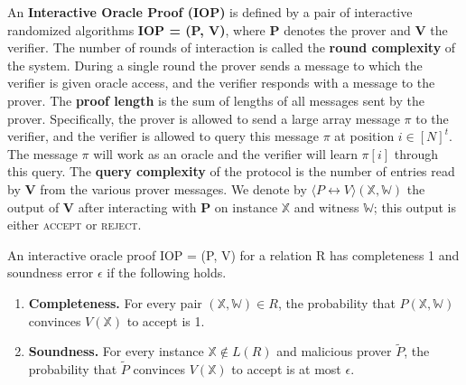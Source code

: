 \begin{definition}
An \textbf{Interactive Oracle Proof (IOP)} is defined by a pair of interactive randomized
algorithms \textbf{IOP = (P, V)}, where \textbf{P} denotes the prover and \textbf{V} the verifier. 
The number of rounds of interaction is called the \textbf{round complexity} of the system. 
During a single round the prover sends a message to which the verifier is given oracle access, and the verifier responds with a message to the prover. 
The \textbf{proof length} is the sum of lengths of all messages sent by the prover. Specifically, the prover is allowed to send a large array message $\pi$ to the verifier, and the verifier is allowed to query this message $\pi$ at position $i \in [N]^t$. The message $\pi$ will work as an oracle and the verifier will learn $\pi[i]$ through this query.
The \textbf{query complexity} of the protocol is the number of entries read by \textbf{V} from the various prover messages.
We denote by $\langle P \leftrightarrow V \rangle (\mathbb{X}, \mathbb{W})$ the output of \textbf{V} after interacting with \textbf{P} on instance $\mathbb{X}$ and witness $\mathbb{W}$; this output is either \textsc{accept} or \textsc{reject}.

An interactive oracle proof IOP = (P, V) for a relation R has completeness 1 and soundness error $\epsilon$ if the following holds.

\begin{enumerate}
    \item \textbf{Completeness.}
    For every pair $(\mathbb{X}, \mathbb{W}) \in R$, the probability that $P(\mathbb{X}, \mathbb{W})$ convinces $V(\mathbb{X})$ to accept is 1.
    
    \item \textbf{Soundness.}
    For every instance $\mathbb{X} \not\in L(R)$ and malicious prover $\tilde{P}$, the probability that $\tilde{P}$ convinces $V(\mathbb{X})$ to accept is at most $\epsilon$.
\end{enumerate}
\end{definition}

